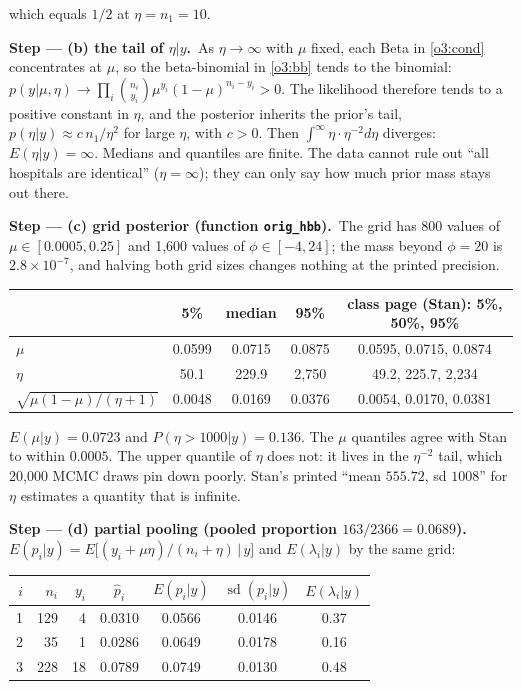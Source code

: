 \documentclass[11pt,a4paper]{article}
\newcommand{\passo}[2]{\par\smallskip\noindent\textbf{Step --- #1.}~#2}
\begin{document}
\begin{sol}
{which equals $1/2$ at $\eta=n_1=10$.}
\passo{(b) the tail of $\eta|y$}{As $\eta\to\infty$ with $\mu$ fixed, each Beta in \eqref{o3:cond} concentrates at $\mu$, so the beta-binomial in \eqref{o3:bb} tends to the binomial: $p(y|\mu,\eta)\to\prod_i\binom{n_i}{y_i}\mu^{y_i}(1-\mu)^{n_i-y_i}>0$. The likelihood therefore tends to a positive constant in $\eta$, and the posterior inherits the prior's tail, $p(\eta|y)\approx c\,n_1/\eta^2$ for large $\eta$, with $c>0$. Then $\int^\infty\eta\cdot\eta^{-2}d\eta$ diverges: $E(\eta|y)=\infty$. Medians and quantiles are finite. The data cannot rule out ``all hospitals are identical'' ($\eta=\infty$); they can only say how much prior mass stays out there.}
\passo{(c) grid posterior (function \texttt{orig\_hbb})}{The grid has 800 values of $\mu\in[0.0005,0.25]$ and 1{,}600 values of $\phi\in[-4,24]$; the mass beyond $\phi=20$ is $2.8\times10^{-7}$, and halving both grid sizes changes nothing at the printed precision.
\begin{center}\small
\begin{tabular}{lccc@{\qquad}c}
\toprule
& 5\% & median & 95\% & class page (Stan): 5\%, 50\%, 95\%\\
\midrule
$\mu$ & 0.0599 & 0.0715 & 0.0875 & 0.0595, 0.0715, 0.0874\\
$\eta$ & 50.1 & 229.9 & 2{,}750 & 49.2, 225.7, 2{,}234\\
$\sqrt{\mu(1-\mu)/(\eta+1)}$ & 0.0048 & 0.0169 & 0.0376 & 0.0054, 0.0170, 0.0381\\
\bottomrule
\end{tabular}
\end{center}
$E(\mu|y)=0.0723$ and $P(\eta>1000|y)=0.136$. The $\mu$ quantiles agree with Stan to within $0.0005$. The upper quantile of $\eta$ does not: it lives in the $\eta^{-2}$ tail, which 20{,}000 MCMC draws pin down poorly. Stan's printed ``mean $555.72$, sd $1008$'' for $\eta$ estimates a quantity that is infinite.}
\passo{(d) partial pooling (pooled proportion $163/2366=0.0689$)}{$E(p_i|y)=E\big[(y_i+\mu\eta)/(n_i+\eta)\,\big|\,y\big]$ and $E(\lambda_i|y)$ by the same grid:
\begin{center}\small
\begin{tabular}{rrrcccc}
\toprule
$i$ & $n_i$ & $y_i$ & $\hat p_i$ & $E(p_i|y)$ & $\operatorname{sd}(p_i|y)$ & $E(\lambda_i|y)$\\
\midrule
1 & 129 & 4 & 0.0310 & 0.0566 & 0.0146 & 0.37\\
2 & 35 & 1 & 0.0286 & 0.0649 & 0.0178 & 0.16\\
3 & 228 & 18 & 0.0789 & 0.0749 & 0.0130 & 0.48\\

\end{tabular}
\end{center}}
\end{sol}
\end{document}
